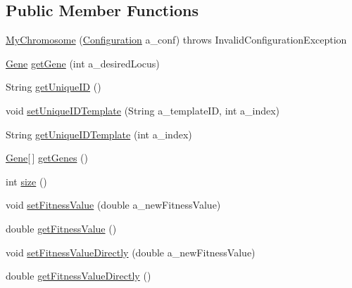 \subsection*{Public Member Functions}
\begin{DoxyCompactItemize}
\item 
\hyperlink{classorg_1_1jgap_1_1_genotype_test_1_1_my_chromosome_a33590ad6adb4bfbdab418d8e8a78b5e9}{My\-Chromosome} (\hyperlink{classorg_1_1jgap_1_1_configuration}{Configuration} a\-\_\-conf)  throws Invalid\-Configuration\-Exception 
\item 
\hyperlink{interfaceorg_1_1jgap_1_1_gene}{Gene} \hyperlink{classorg_1_1jgap_1_1_genotype_test_1_1_my_chromosome_ae5110cb67ea8a3880b0052890dba7ea8}{get\-Gene} (int a\-\_\-desired\-Locus)
\item 
String \hyperlink{classorg_1_1jgap_1_1_genotype_test_1_1_my_chromosome_ae3ea445bb5d440b904a1a5d1edc6387e}{get\-Unique\-I\-D} ()
\item 
void \hyperlink{classorg_1_1jgap_1_1_genotype_test_1_1_my_chromosome_a4569712147dd31fb4307dfe88e7bb283}{set\-Unique\-I\-D\-Template} (String a\-\_\-template\-I\-D, int a\-\_\-index)
\item 
String \hyperlink{classorg_1_1jgap_1_1_genotype_test_1_1_my_chromosome_a80c37f479ddf7175e8c2569208dc9364}{get\-Unique\-I\-D\-Template} (int a\-\_\-index)
\item 
\hyperlink{interfaceorg_1_1jgap_1_1_gene}{Gene}\mbox{[}$\,$\mbox{]} \hyperlink{classorg_1_1jgap_1_1_genotype_test_1_1_my_chromosome_a18f5051e360985aa85e7dad63266bab5}{get\-Genes} ()
\item 
int \hyperlink{classorg_1_1jgap_1_1_genotype_test_1_1_my_chromosome_a42bdfe312e3f05b10ba8b1f2ab1588cf}{size} ()
\item 
void \hyperlink{classorg_1_1jgap_1_1_genotype_test_1_1_my_chromosome_a2ce2c7ac07f0581cccc3f94367e43b1a}{set\-Fitness\-Value} (double a\-\_\-new\-Fitness\-Value)
\item 
double \hyperlink{classorg_1_1jgap_1_1_genotype_test_1_1_my_chromosome_a60478ceef952e45e61ab80e56192e805}{get\-Fitness\-Value} ()
\item 
void \hyperlink{classorg_1_1jgap_1_1_genotype_test_1_1_my_chromosome_a00e24b5ada37e05d509cd165155fb61c}{set\-Fitness\-Value\-Directly} (double a\-\_\-new\-Fitness\-Value)
\item 
double \hyperlink{classorg_1_1jgap_1_1_genotype_test_1_1_my_chromosome_aa1642265bd829ee4fdba8dede5d2ae5e}{get\-Fitness\-Value\-Directly} ()
\item 

\end{DoxyCompactItemize}
